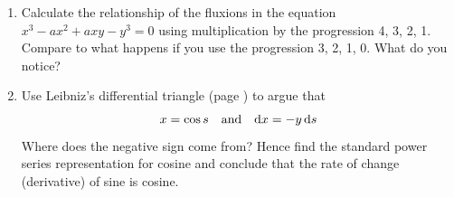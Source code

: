 \begin{exercises}{}{}
\begin{enumerate}
		
		
		
		\item%
		Calculate the relationship of the fluxions in the equation $x^3-ax^2+axy-y^3=0$ using multiplication by the progression 4, 3, 2, 1. Compare to what happens if you use the progression 3, 2, 1, 0. What do you notice?
		
		
		\item Use Leibniz's differential triangle (page \pageref{pg:leibniz}) to argue that
		\[
			x=\cos s\quad\text{and}\quad {\mathrm{d}x}=-y\,{\mathrm{d} s}
		\]
		Where does the negative sign come from? Hence find the standard power series representation for cosine and conclude that the rate of change (derivative) of sine is cosine.
		

\end{enumerate}
\end{exercises}
